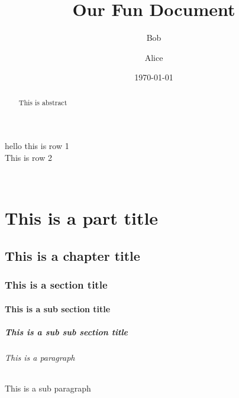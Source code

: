 \documentclass[12pt, a4paper]{report}
\begin{document}
\title{Our Fun Document}
\author{Bob \and Alice}
\date{\today}
\maketitle

\renewcommand{\abstractname}{New abstract \LaTeX{} title}
\begin{abstract}

    This is abstract
    \lipsum[1]

\end{abstract}


\newpage
hello this is row 1\\This is row 2

\newpage
\lipsum[2]\\
\lipsum[3]

\part{This is a part title}
\chapter{This is a chapter title}
\section{This is a section title}
\subsection{This is a sub section title}
\subsubsection{This is a sub sub section title}
\paragraph{This is a paragraph}
\subparagraph{This is a sub paragraph}

\end{document}
